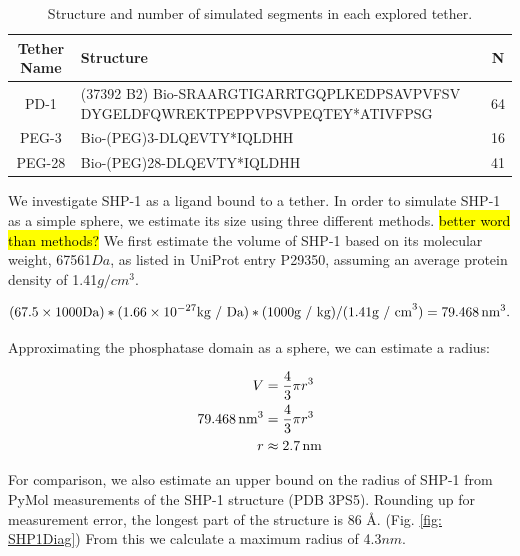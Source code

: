\documentclass[../../AdvancementSummary.tex]{subfiles}
\begin{document}
\begin{table}
\caption{Structure and number of simulated segments in each explored tether. \label{table: Tethers}}
\begin{center}
\begin{tabular}{| c | p{10cm} | c |}
    \hline
        Tether Name & Structure & N \\ 
        \hline 
        PD-1    &   (37392 B2) Bio-SRAARGTIGARRTGQPLKEDPSAVPVFSV
                    DYGELDFQWREKTPEPPVPSVPEQTEY*ATIVFPSG            &   64   \\
        PEG-3   &   Bio-(PEG)3-DLQEVTY*IQLDHH                           &   16   \\ 
        PEG-28  &   Bio-(PEG)28-DLQEVTY*IQLDHH                          &   41   \\
    \hline
\end{tabular}
\end{center}
\end{table}

We investigate SHP-1 as a ligand bound to a tether. In order to simulate SHP-1 as a simple sphere, we estimate its size using three different methods. \hl{better word than methods?} We first estimate the volume of SHP-1 based on its molecular weight, 67561$Da$,  as listed in UniProt entry P29350, assuming an average protein density of 1.41$g/cm^3$. \cite{Fischer2004}


\begin{equation*}
(67.5 \times 1000 \mbox{Da}) * (1.66\times10^{-27} \mbox{kg / Da}) * (1000 \mbox{g / kg}) / (1.41 \mbox{g / cm}^3) = 79.468 \,\mbox{nm}^3.
\end{equation*}

Approximating the phosphatase domain as a sphere, we can estimate a radius: 

\begin{align*}
V &= \frac{4}{3}\pi r^3 \\
79.468 \,\mbox{nm}^3 &= \frac{4}{3} \pi r^3 \\
r &\approx 2.7 \,\mbox{nm} \\
\end{align*}

For comparison, we also estimate an upper bound on the radius of SHP-1 from PyMol measurements of the SHP-1 structure (PDB 3PS5). Rounding up for measurement error, the longest part of the structure is 86 \AA. (Fig. \ref{fig: SHP1Diag}) From this we calculate a maximum radius of 4.3$nm$.
\end{document}
